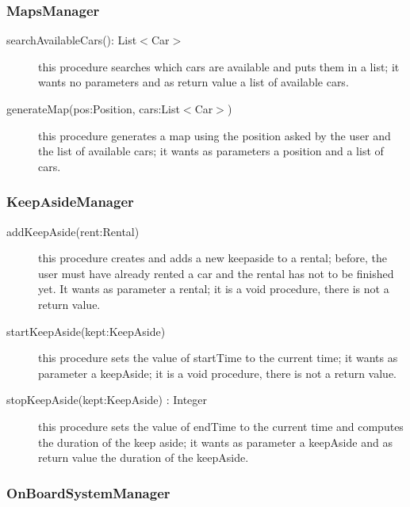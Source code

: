 \documentclass{scrreprt}
\begin{document}
\subsubsection{MapsManager}

\begin{description}
\item[searchAvailableCars(): List$<$Car$>$] this procedure searches which cars are available and puts them in a list; it wants no parameters and as return value a list of available cars.
\item[generateMap(pos:Position, cars:List$<$Car$>$)] this procedure generates a map using the position asked by the user and the list of available cars; it wants as parameters a position and a list of cars.
\end{description}

\subsubsection{KeepAsideManager}

\begin{description}
\item[addKeepAside(rent:Rental)] this procedure creates and adds a new keepaside to a rental; before, the user must have already rented a car and the rental has not to be finished yet. It wants as parameter a rental; it is a void procedure, there is not a return value.
\item[startKeepAside(kept:KeepAside)] this procedure sets the value of startTime to the current time; it wants as parameter a keepAside; it is a void procedure, there is not a return value.
\item[stopKeepAside(kept:KeepAside) : Integer] this procedure sets the value of endTime to the current time and computes the duration of the keep aside; it wants as parameter a keepAside and as return value the duration of the keepAside.
\end{description}

\subsubsection{OnBoardSystemManager}
\end{document}
